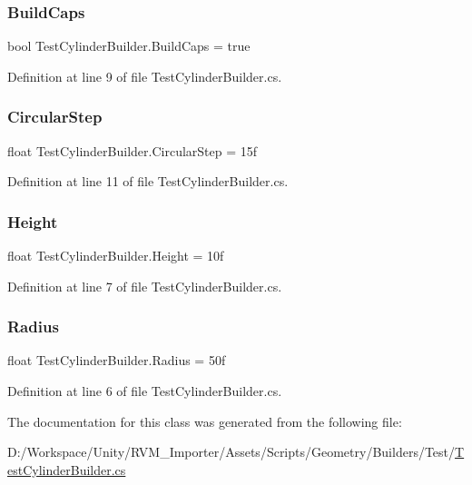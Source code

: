 \subsubsection{\texorpdfstring{BuildCaps}{BuildCaps}}
{\footnotesize\ttfamily bool Test\+Cylinder\+Builder.\+Build\+Caps = true}



Definition at line 9 of file Test\+Cylinder\+Builder.\+cs.

\mbox{\label{class_test_cylinder_builder_a8bc608e86857b56920743af1084ab6a6}} 
\subsubsection{\texorpdfstring{CircularStep}{CircularStep}}
{\footnotesize\ttfamily float Test\+Cylinder\+Builder.\+Circular\+Step = 15f}



Definition at line 11 of file Test\+Cylinder\+Builder.\+cs.

\mbox{\label{class_test_cylinder_builder_aedd952dfb0ae3ec8f0d4e1970f56d978}} 
\subsubsection{\texorpdfstring{Height}{Height}}
{\footnotesize\ttfamily float Test\+Cylinder\+Builder.\+Height = 10f}



Definition at line 7 of file Test\+Cylinder\+Builder.\+cs.

\mbox{\label{class_test_cylinder_builder_a892113deef5211dc7f189d0c721a3786}} 
\subsubsection{\texorpdfstring{Radius}{Radius}}
{\footnotesize\ttfamily float Test\+Cylinder\+Builder.\+Radius = 50f}



Definition at line 6 of file Test\+Cylinder\+Builder.\+cs.



The documentation for this class was generated from the following file\+:\begin{DoxyCompactItemize}
\item 
D\+:/\+Workspace/\+Unity/\+R\+V\+M\+\_\+\+Importer/\+Assets/\+Scripts/\+Geometry/\+Builders/\+Test/\mbox{\hyperlink{_test_cylinder_builder_8cs}{Test\+Cylinder\+Builder.\+cs}}\end{DoxyCompactItemize}
